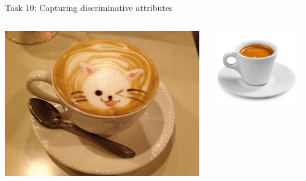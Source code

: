 \documentclass[10pt, compress]{beamer}
\begin{document}
\begin{frame}{Task 10: Capturing discriminative attributes}
\begin{columns}
  \begin{column}{0.3\textwidth}
    \centering
    \includegraphics[width=\textwidth]{graphics/discrim-cappuccino.jpg}
  \end{column}
  \begin{column}{0.3\textwidth}
    \centering
    \includegraphics[width=\textwidth]{graphics/discrim-espresso.jpg}
  \end{column}
  \begin{column}{0.3\textwidth}
    \centering

\end{column}
\end{columns}
\end{frame}
\end{document}
